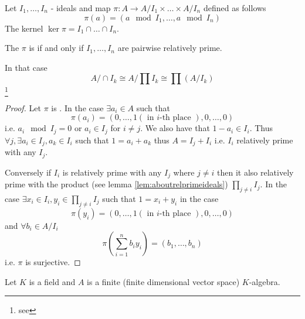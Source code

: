 \begin{theorem}
  Let $I_1, \dots, I_n$ - ideals and map
  $\pi: A \to A/I_1 \times \dots \times A/I_n$ defined as follows
  \[
  \pi(a) = \left(a \mod I_1, \dots, a \mod I_n\right)
  \]
  The kernel $\ker \pi = I_1 \cap \dots \cap I_n$.

  The $\pi$ is  if and only if $I_1, \dots,
  I_n$ are pairwise relatively prime.

  In that case
  \[
  A/\cap I_k
  \cong
  A/\prod I_k
  \cong
  \prod \left(A/I_k\right)
  \]
  \footnote{
    see 
  }
  
  \begin{proof}
    Let $\pi$ is . In the case
    $\exists a_i \in A$ such that
    \[
    \pi(a_i) = \left(0, \dots, 1 (\mbox{ in }i\mbox{-th place }),
    0, \dots, 0\right)
    \]
    i.e.
    $a_i \mod I_j = 0$ or $a_i \in I_j$ for $i \ne j$. We also have
    that $1 - a_i \in I_i$.
    Thus $\forall j, \exists a_i \in I_j, a_k \in I_i$ such that
    $1 = a_i + a_k$ thus $A = I_j + I_i$ i.e. $I_i$ relatively prime
    with any $I_j$.

    Conversely if $I_i$ is relatively prime with any $I_j$ where $j
    \ne i$ then it also relatively prime with the product (see lemma
    \ref{lem:aboutrelprimeideals}) $\prod_{j \ne i} I_j$. In the case
    $\exists x_i \in I_i, y_i \in \prod_{j \ne i} I_j$ such that
    $1 = x_i + y_i$ in the case
    \[
    \pi(y_i) = \left(0, \dots, 1 (\mbox{ in }i\mbox{-th place }),
    0, \dots, 0\right)
    \]
    and $\forall b_i \in A/I_i$
    \[
    \pi \left(\sum_{i = 1}^n b_i y_i\right) =
    \left(b_1, \dots, b_n\right)
    \]
    i.e. $\pi$ is surjective.
  \end{proof}
  \label{thm:chineseremainder}
\end{theorem}

Let $K$ is a field and $A$ is a finite (finite dimensional vector
space) $K$-algebra.


